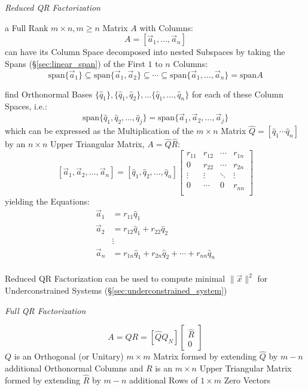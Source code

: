 \emph{Reduced QR Factorization}

a Full Rank $m \times n, m \geq n$ Matrix $A$ with Columns:
\[
  A = [ \vec{a}_1, \ldots, \vec{a}_n ]
\]
can have its Column Space decomposed into nested Subspaces by taking the Spans
(\S\ref{sec:linear_span}) of the First $1$ to $n$ Columns:
\[
  \mathrm{span} \{ \vec{a}_1 \} \subseteq
  \mathrm{span} \{ \vec{a}_1, \vec{a}_2 \}
  \subseteq \cdots \subseteq
  \mathrm{span} \{ \vec{a}_1, \ldots, \vec{a}_n \}
  = \mathrm{span} A
\]

find Orthonormal Bases $\{ \hat{q}_1 \}, \{ \hat{q}_1, \hat{q}_2 \}, \ldots \{
\hat{q}_1, \ldots, \hat{q}_n\}$ for each of these Column Spaces, i.e.:
\[
  \mathrm{span} \{ \hat{q}_1, \hat{q}_2, \ldots, \hat{q}_j \} =
  \mathrm{span} \{ \vec{a}_1, \vec{a}_2, \ldots, \vec{a}_j \}
\]
which can be expressed as the Multiplication of the $m \times n$ Matrix
$\hat{Q} = [ \hat{q}_1 \cdots \hat{q}_n ]$ by an $n \times n$ Upper Triangular
Matrix, $A = \hat{Q}\hat{R}$:
\[
  [\vec{a}_1, \vec{a}_2, \ldots, \vec{a}_n] =
  [\hat{q}_1, \hat{q}_2, \ldots, \hat{q}_n]
  \begin{bmatrix}
    r_{11} & r_{12} & \cdots & r_{1n} \\
    0      & r_{22} & \cdots & r_{2n} \\
    \vdots & \vdots & \ddots & \vdots \\
    0      & \cdots & 0      & r_{nn} \\
  \end{bmatrix}
\]
yielding the Equations:
\begin{align*}
  \vec{a}_1 & = r_{11}\hat{q}_1 \\
  \vec{a}_2 & = r_{12}\hat{q}_1 + r_{22}\hat{q}_2 \\
            & \vdots \\
  \vec{a}_n & = r_{1n}\hat{q}_1 + r_{2n}\hat{q}_2 + \cdots + r_{nn}\hat{q}_n \\
\end{align*}

Reduced QR Factorization can be used to compute minimal $\|\vec{x}\|^2$ for
Underconstrained Systems (\S\ref{sec:underconstrained_system})


\emph{Full QR Factorization}

\[
  A = QR = [\hat{Q}Q_N]\begin{bmatrix} \hat{R} \\ 0 \end{bmatrix}
\]
$Q$ is an Orthogonal (or Unitary) $m \times m$ Matrix formed by extending
$\hat{Q}$ by $m - n$ additional Orthonormal Columns and $R$ is an $m \times n$
Upper Triangular Matrix formed by extending $\hat{R}$ by $m - n$ additional
Rows of $1 \times m$ Zero Vectors

